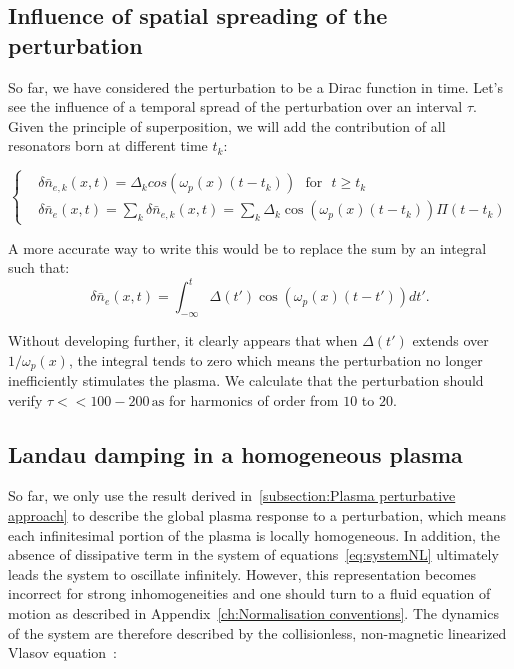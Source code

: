 \subsection{Influence of spatial spreading of the perturbation}


So far, we have considered the perturbation to be a Dirac function in time. Let's see the influence of a temporal spread of the perturbation over an interval $\tau$. 
Given the principle of superposition, we will add the contribution of all resonators born at different time $t_k$: 


\begin{equation}
  \left\{
      \begin{aligned}
&\delta\bar{n}_{e,k}(x,t) = \Delta_k cos(\omega_p(x) (t-t_k)) \ \ \  \mbox{for} \ \ \  t \ge t_k\\
&\delta \bar{n}_e(x,t) =\sum_{k}\delta\bar{n}_{e,k}(x,t) = \sum_{k}\Delta_k \cos(\omega_p(x) (t-t_k))\Pi(t-t_k) 
      \end{aligned}
    \right.
\label{eq:SeveralResonnator}
\end{equation}

\noindent A more accurate way to write this would be to replace the sum by an integral such that:
\begin{equation}
\delta \bar{n}_e(x,t) =\int_{-\infty}^t\Delta(t') \cos(\omega_p(x) (t-t'))dt' .
\end{equation}

\noindent Without developing further, it clearly appears that when $\Delta (t')$ extends over $1/\omega_p(x)$, the integral tends to zero which means the perturbation no longer inefficiently stimulates the plasma. We calculate that the perturbation should verify $\tau << 100-200\,\mathrm{as}$ for harmonics of order from $10$ to $20$. 

\subsection{Landau damping in a homogeneous plasma}\label{Landau damping in an inhomogeneous plasma}

So far, we only use the result derived in~\ref{subsection:Plasma perturbative approach} to describe the global plasma response to a perturbation, which means each infinitesimal portion of the plasma is locally homogeneous. In addition, the absence of dissipative term in the system of equations~\ref{eq:systemNL} ultimately leads the system to oscillate infinitely. However, this representation becomes incorrect for strong inhomogeneities and one should turn to a fluid equation of motion \cite{mora2011introduction} as described in Appendix~\ref{ch:Normalisation conventions}. The dynamics of the system are therefore described by the collisionless, non-magnetic linearized Vlasov equation~\cite{vlasov1945theory}:


